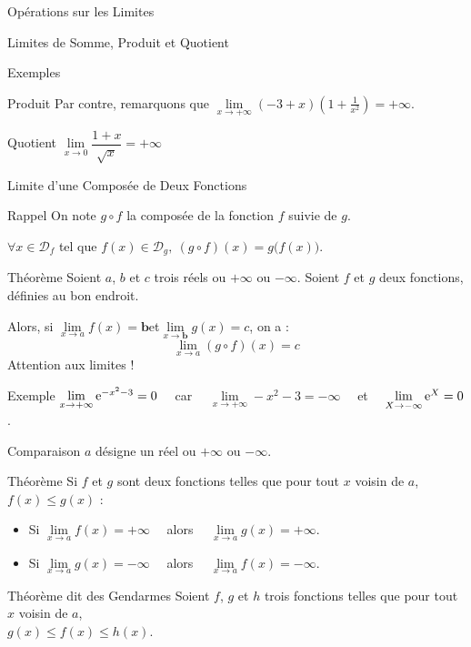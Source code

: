 \documentclass{coursbook}
\begin{document}
\begin{Gpartie}{Opérations sur les Limites}
\begin{Spartie}{Limites de Somme, Produit et Quotient}
\begin{SSpartie}{Exemples}
\begin{SSSpartie}{Produit}
                    Par contre, remarquons que $\lim\limits_{x\to+\infty}\left(-3+x\right)\left(1+\frac{1}{x^2}\right)=+\infty$.
                \end{SSSpartie}
                \begin{SSSpartie}{Quotient} 
                    $\lim\limits_{x\to0}\dfrac{1+x}{\sqrt{x}}=+\infty$
                \end{SSSpartie}
            \end{SSpartie}
        \end{Spartie}
        \begin{Spartie}{Limite d'une Composée de Deux Fonctions} 
            \begin{SSpartie}{Rappel} 
                On note $g\circ f$ la composée de la fonction $f$ suivie de $g$.

                $\forall x\in\mathcal{D}_f$ tel que $f(x)\in\mathcal{D}_g,~(g\circ f)(x)=g\big(f(x)\big)$.
            \end{SSpartie}
            \begin{SSpartie}{Théorème} 
                Soient $a$, $b$ et $c$ trois réels ou $+\infty$ ou $-\infty$. Soient $f$ et $g$ deux fonctions, définies au bon endroit. 
                
                Alors, si $\lim\limits_{x\to a}f(x)=\boxed{\boldsymbol{b}}$\quad et\quad$\lim\limits_{x\to\boxed{\boldsymbol{b}}}g(x)=c$, on a : \[\lim\limits_{x\to a}(g\circ f)(x)=c\]
                Attention aux limites !
            \end{SSpartie}
            \begin{SSpartie}{Exemple} 
                $\lim\limits_{x\to+\infty}\mathrm{e}^{-x^2-3}=0\quad$ car $\quad\lim\limits_{x\to+\infty}-x^2-3=-\infty\quad$ et $\quad\lim\limits_{X\to-\infty}\mathrm{e}^X=0$.
            \end{SSpartie}
        \end{Spartie}
        \begin{Spartie}{Comparaison} 
            $a$ désigne un réel ou $+\infty$ ou $-\infty$.
            \begin{SSpartie}{Théorème} 
                Si $f$ et $g$ sont deux fonctions telles que pour tout $x$ voisin de $a$, $f(x)\leq g(x)$ :
                \begin{itemize}
                    \item Si $\lim\limits_{x\to a}f(x)=+\infty\quad$ alors $\quad\lim\limits_{x\to a}g(x)=+\infty$.
                    \item Si $\lim\limits_{x\to a}g(x)=-\infty\quad$ alors $\quad\lim\limits_{x\to a}f(x)=-\infty$.
                \end{itemize}
            \end{SSpartie}
            \begin{SSpartie}{Théorème dit \og des Gendarmes \fg{}} 
                Soient $f$, $g$ et $h$ trois fonctions telles que pour tout $x$ voisin de $a$, \\ $g(x)\leq f(x)\leq h(x)$.


\end{SSpartie}
\end{Spartie}
\end{Gpartie}
\end{document}
